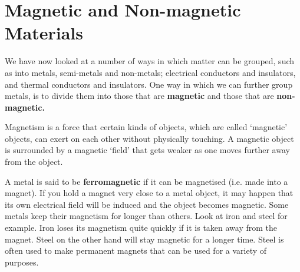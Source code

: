             \section{Magnetic and Non-magnetic Materials}
            \nopagebreak
      \label{m38706*id67151}We have now looked at a number of ways in which matter can be grouped, such as into metals, semi-metals and non-metals; electrical conductors and insulators, and thermal conductors and insulators. One way in which we can further group metals, is to divide them into those that are \textbf{magnetic} and those that are \textbf{non-magnetic.}\par 
{} 
 { \label{m38706*meaningfhsst!!!underscore!!!id570}
      \label{m38706*id67174}Magnetism is a force that certain kinds of objects, which are called `magnetic' objects, can exert on each other without physically touching. A magnetic object is surrounded by a magnetic `field' that gets weaker as one moves further away from the object. \par 
       } 
\begin{minipage}{.5\textwidth}
      \label{m38706*id67186}A metal is said to be \textbf{ferromagnetic} if it can be magnetised (i.e. made into a magnet). If you hold a magnet very close to a metal object, it may happen that its own electrical field will be induced and the object becomes magnetic. Some metals keep their magnetism for longer than others. Look at iron and steel for example. Iron loses its magnetism quite quickly if it is taken away from the magnet. Steel on the other hand will stay magnetic for a longer time. Steel is often used to make permanent magnets that can be used for a variety of purposes.\par 
\end{minipage}
